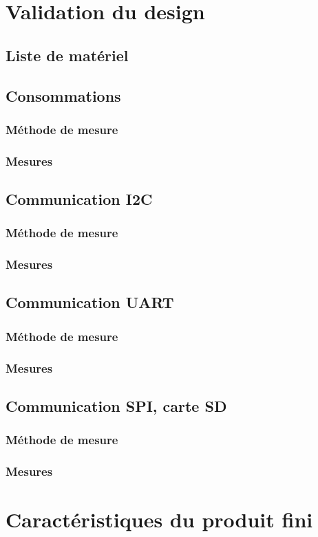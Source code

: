 \clearpage

\section{Validation du design} \label{sec:Validation-design}

\subsection{Liste de matériel} \label{ssec:Liste-materiel}

\subsection{Consommations}
\subsubsection{Méthode de mesure}
\subsubsection{Mesures}


\subsection{Communication I2C} \label{ssec:Comm-I2C}
\subsubsection{Méthode de mesure}
\subsubsection{Mesures}

\subsection{Communication UART} \label{ssec:Comm-UART}
\subsubsection{Méthode de mesure}
\subsubsection{Mesures}

\subsection{Communication SPI, carte SD} \label{ssec:Comm-SPI}
\subsubsection{Méthode de mesure}
\subsubsection{Mesures}

\section{Caractéristiques du produit fini} \label{sec:Carac-finis}